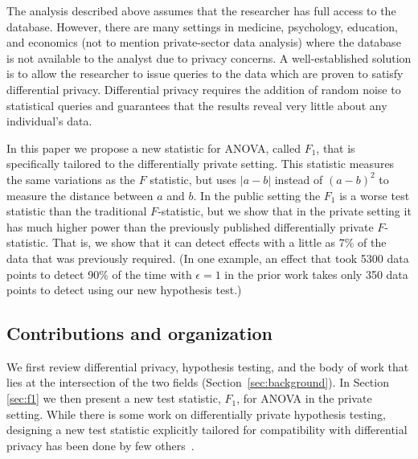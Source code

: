 The analysis described above assumes that the researcher has full access to the database. However, there are many settings in medicine, psychology, education, and economics (not to mention private-sector data analysis) where the database is not available to the analyst due to privacy concerns. A well-established solution is to allow the researcher to issue queries to the data which are proven to satisfy differential privacy.  Differential privacy requires the addition of random noise to statistical queries and guarantees that the results reveal very little about any individual's data.

In this paper we propose a new statistic for ANOVA, called $F_1$, that is specifically tailored to the differentially private setting. This statistic measures the same variations as the $F$ statistic, but uses $|a-b|$ instead of $(a-b)^2$ to measure the distance between $a$ and $b$.  In the public setting the $F_1$ is a worse test statistic than the traditional $F$-statistic, but we show that in the private setting it has much higher power than the previously published differentially private $F$-statistic.  That is, we show that it can detect effects with a little as 7\% of the data that was previously required.  (In one example, an effect that took 5300 data points to detect 90\% of the time with $\epsilon=1$ in the prior work takes only 350 data points to detect using our new hypothesis test.)




\subsection{Contributions and organization}

We first review differential privacy, hypothesis testing, and the body of work that lies at the intersection of the two fields (Section~\ref{sec:background}).  
In Section \ref{sec:f1} we then present a new test statistic, $F_1$, for ANOVA in the private setting.  While there is some work on differentially private hypothesis testing, designing a new test statistic explicitly tailored for compatibility with differential privacy has been done by few others~\cite{rogers2017new}.  


